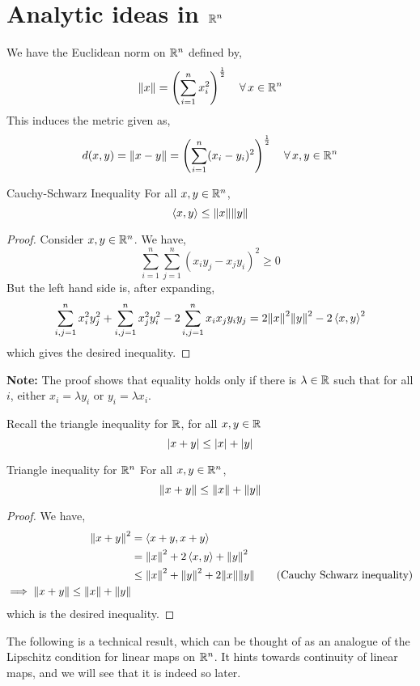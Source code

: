 \documentclass[../Analysis-3.tex]{subfiles}
\begin{document}
\section{Analytic ideas in $ \mathbb{R}^n $}

We have the Euclidean norm on $ \mathbb{R}^n $ defined by,
\[ \norm{x} = \left(\sum_{i=1}^{n}x_i^2\right)^{\frac 12} \quad \forall \, x \in \mathbb{R}^n \]
This induces the metric given as,
\[ d(x,y) = \norm{x-y} = \left(\sum_{i=1}^{n}(x_i-y_i)^2\right)^{\frac 12} \quad \forall \, x,y \in \mathbb{R}^n \]

\begin{Thm}{Cauchy-Schwarz Inequality}{}
  For all $ x,y \in \mathbb{R}^n $, \[ \left\langle {x}, {y} \right\rangle \leq \norm{x} \norm{y} \]
\end{Thm}
\begin{proof}
  Consider $ x,y \in \mathbb{R}^n $. We have,
  \[ \sum_{i=1}^{n}\sum_{j=1}^{n} (x_iy_j - x_jy_i)^2 \geq 0 \]
  But the left hand side is, after expanding,
  \[ \sum_{i,j = 1}^{n} x_i^2y_j^2 + \sum_{i,j = 1}^{n} x_j^2y_i^2 - 2 \sum_{i,j=1}^{n} x_ix_j y_iy_j = 2 \norm{x}^2\norm{y}^2 - 2\left\langle {x}, {y} \right\rangle^2 \]
  which gives the desired inequality.
\end{proof}

\textbf{Note:} The proof shows that equality holds only if there is $ \lambda \in \mathbb{R} $ such that for all $ i $, either $ x_i = \lambda y_i $ or $ y_i = \lambda x_i $.
\msk

Recall the triangle inequality for $ \mathbb{R} $, for all $ x,y \in \mathbb{R} $
\[ \abs{x+y} \leq \abs{x} + \abs{y} \]

\begin{Thm}{Triangle inequality for $ \mathbb{R}^n $}{}
  For all $ x,y \in \mathbb{R}^n $,
  \[ \norm{x+y} \leq \norm{x} + \norm{y} \]
\end{Thm}
\begin{proof}
  We have,
  \begin{align*}
    \norm{x+y}^2 & = \left\langle {x+y}, {x+y} \right\rangle                                                                 \\
                 & = \norm{x}^2 + 2\left\langle {x}, {y} \right\rangle + \norm{y}^2                                             \\
                 & \leq \norm{x}^2 + \norm{y}^2 +2 \norm{x}\norm{y} \tag{Cauchy Schwarz inequality} \\
    \implies \norm{x+y} \leq \norm{x} + \norm{y}
  \end{align*}
  which is the desired inequality.
\end{proof}
\msk

The following is a technical result, which can be thought of as an analogue of the Lipschitz condition for linear maps on $ \mathbb{R}^n $. It hints towards continuity of linear maps, and we will see that it is indeed so later.
\ssk
\end{document}
